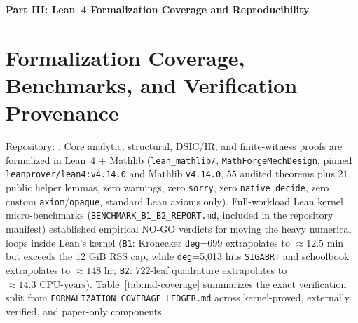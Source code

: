 \medskip
\noindent\textbf{Part III: Lean~4 Formalization Coverage and Reproducibility}
\medskip

\section{Formalization Coverage, Benchmarks, and Verification Provenance}\label{sec:formalization}

Repository: \texttt{\PaperRepoURL}. Core analytic, structural, DSIC/IR, and finite-witness proofs are formalized in Lean~4 + Mathlib (\texttt{lean\_mathlib/}, \texttt{MathForgeMechDesign}, pinned \texttt{leanprover/lean4:v4.14.0} and Mathlib \texttt{v4.14.0}, $55$ audited theorems plus $21$ public helper lemmas, zero warnings, zero \texttt{sorry}, zero \texttt{native\_decide}, zero custom \texttt{axiom}/\texttt{opaque}, standard Lean axioms only). Full-workload Lean kernel micro-benchmarks (\texttt{BENCHMARK\_B1\_B2\_REPORT.md}, included in the repository manifest) established empirical NO-GO verdicts for moving the heavy numerical loops inside Lean's kernel (\texttt{B1}: Kronecker \texttt{deg}=699 extrapolates to $\approx 12.5\text{ min}$ but exceeds the $12\text{ GiB}$ RSS cap, while \texttt{deg}=5{,}013 hits \texttt{SIGABRT} and schoolbook extrapolates to $\approx 148\text{ hr}$; \texttt{B2}: $722$-leaf quadrature extrapolates to $\approx 14.3\text{ CPU-years}$). Table~\ref{tab:md-coverage} summarizes the exact verification split from \texttt{FORMALIZATION\_COVERAGE\_LEDGER.md} across kernel-proved, externally verified, and paper-only components.

